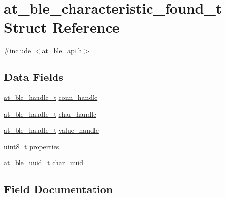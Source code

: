 \hypertarget{structat__ble__characteristic__found__t}{}\section{at\+\_\+ble\+\_\+characteristic\+\_\+found\+\_\+t Struct Reference}
\label{structat__ble__characteristic__found__t}


{\ttfamily \#include $<$at\+\_\+ble\+\_\+api.\+h$>$}

\subsection*{Data Fields}
\begin{DoxyCompactItemize}
\item 
\mbox{\hyperlink{at__ble__api_8h_abd23646d0c662860741f787efc8456f2}{at\+\_\+ble\+\_\+handle\+\_\+t}} \mbox{\hyperlink{structat__ble__characteristic__found__t_ae42df6fd8493f8f8faeccfdd6062e96f}{conn\+\_\+handle}}
\item 
\mbox{\hyperlink{at__ble__api_8h_abd23646d0c662860741f787efc8456f2}{at\+\_\+ble\+\_\+handle\+\_\+t}} \mbox{\hyperlink{structat__ble__characteristic__found__t_abf2dd98b1df5d9471f3e18780eb5e5a7}{char\+\_\+handle}}
\item 
\mbox{\hyperlink{at__ble__api_8h_abd23646d0c662860741f787efc8456f2}{at\+\_\+ble\+\_\+handle\+\_\+t}} \mbox{\hyperlink{structat__ble__characteristic__found__t_a784b76919ceb578bc00cc11238adb573}{value\+\_\+handle}}
\item 
uint8\+\_\+t \mbox{\hyperlink{structat__ble__characteristic__found__t_a9186ef511fa792a0dec18079d57071ef}{properties}}
\item 
\mbox{\hyperlink{structat__ble__uuid__t}{at\+\_\+ble\+\_\+uuid\+\_\+t}} \mbox{\hyperlink{structat__ble__characteristic__found__t_a65364ec07b0a94842721d24a6723d404}{char\+\_\+uuid}}
\end{DoxyCompactItemize}


\subsection{Field Documentation}
\mbox{\label{structat__ble__characteristic__found__t_abf2dd98b1df5d9471f3e18780eb5e5a7}} 

